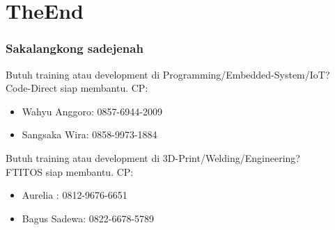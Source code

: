\documentclass[table,dvipsnames]{beamer}
\begin{document}
	\section{TheEnd}
	\begin{frame}
		\frametitle{Sakalangkong sadejenah}
		\begin{exampleblock}{}
			Butuh training atau development di Programming/Embedded-System/IoT?\\
			Code-Direct siap membantu. CP:
			\begin{itemize}
				\item Wahyu Anggoro: 0857-6944-2009
				\item Sangsaka Wira: 0858-9973-1884
			\end{itemize}
		\end{exampleblock}

		\begin{exampleblock}{}
			Butuh training atau development di 3D-Print/Welding/Engineering?\\
			FTITOS siap membantu. CP:
			\begin{itemize}
				\item Aurelia     : 0812-9676-6651
				\item Bagus Sadewa: 0822-6678-5789
			\end{itemize}
		\end{exampleblock}
	\end{frame}
\end{document}
